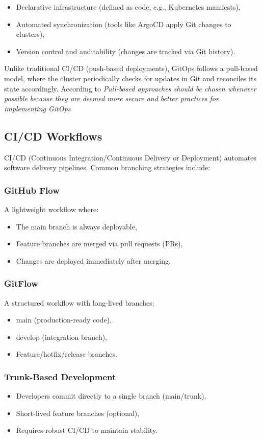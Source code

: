 \begin{itemize}
\item Declarative infrastructure (defined as code, e.g., Kubernetes manifests),
\item Automated synchronization (tools like ArgoCD apply Git changes to clusters),
\item Version control and auditability (changes are tracked via Git history).
\end{itemize}
Unlike traditional CI/CD (push-based deployments), GitOps follows a pull-based model, where the cluster periodically checks for updates in Git and reconciles its state accordingly\cite{devopsbook}.
According to\cite{inproceedings} \textit{Pull-based approaches should be chosen whenever possible because they are deemed
more secure and better practices for implementing GitOps}

\subsection{CI/CD Workflows}\label{subsec:ci/cd-workflows}
CI/CD
 (Continuous Integration/Continuous Delivery or Deployment) automates
software delivery pipelines.
Common branching strategies include:

\subsubsection*{GitHub Flow}
A lightweight workflow where:

\begin{itemize}
\item The main branch is always deployable,
\item Feature branches are merged via pull requests (PRs),
\item Changes are deployed immediately after merging.
\end{itemize}

\subsubsection*{GitFlow}
A structured workflow with long-lived branches:

\begin{itemize}
\item main (production-ready code),
\item develop (integration branch),
\item Feature/hotfix/release branches.
\end{itemize}
\subsubsection*{Trunk-Based Development}
\begin{itemize}
\item Developers commit directly to a single branch (main/trunk),
\item Short-lived feature branches (optional),
\item Requires robust CI/CD to maintain stability.
\end{itemize}

